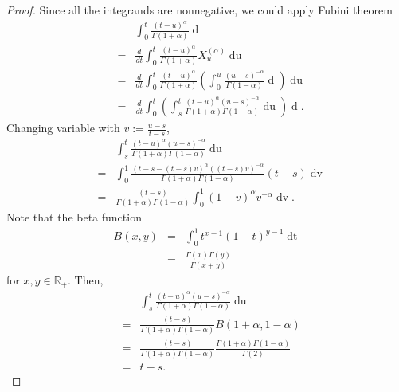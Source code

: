 \documentclass[a4paper, twoside, 11pt]{article}
\theoremstyle{definition}
\newcommand{\brkt}[1]{\left({#1} \right)}
\begin{document}
	\begin{proof}
	  Since all the integrands are nonnegative, we could apply Fubini theorem
	\begin{eqnarray*}
	  &&\int_0^t \frac{(t-u)^\alpha}{\Gamma(1+\alpha)}\mathop{dX^{(\alpha)}_u}\\
	  &=& \frac{d}{dt}\int_0^t \frac{(t-u)^\alpha}{\Gamma(1+\alpha)} X^{(\alpha)}_u\mathop{du}\\
	  &=& \frac{d}{dt}\int_0^t \frac{(t-u)^\alpha}{\Gamma(1+\alpha)} \brkt{ \int_0^u \frac{(u-s)^{-\alpha}}{\Gamma(1-\alpha)}\mathop{dX_s}}\mathop{du}\\
	  &=& \frac{d}{dt}\int_{0}^{t} \brkt{\int_s^t \frac{(t-u)^\alpha (u-s)^{-\alpha}}{\Gamma(1+\alpha)\Gamma(1-\alpha)}\mathop{du}} \mathop{dX_s}.
	\end{eqnarray*}
	Changing variable with $v:= \frac{u-s}{t-s}$,
	\begin{eqnarray*}
	 &&\int_s^t \frac{(t-u)^\alpha (u-s)^{-\alpha}}{\Gamma(1+\alpha)\Gamma(1-\alpha)}\mathop{du}\\
	 &=& \int_0^1 \frac{(t-s - (t-s)v)^\alpha ((t-s)v)^{-\alpha}}{\Gamma(1+\alpha)\Gamma(1-\alpha)}(t-s)\mathop{dv}\\
	 &=& \frac{(t-s)}{\Gamma(1+\alpha)\Gamma(1-\alpha)}\int_0^1 (1-v)^\alpha v^{-\alpha} \mathop{dv}.
	\end{eqnarray*}
  Note that the beta function 
  \begin{eqnarray*}
	B(x,y) &=& \int_0^1 t^{x-1} (1-t)^{y-1} \mathop{dt}\\
	&=& \frac{\Gamma(x)\Gamma(y)}{\Gamma(x+y)}
  \end{eqnarray*}
  for $x, y \in \mathbb{R}_+$.
  Then,
  \begin{eqnarray*}
	 &&\int_s^t \frac{(t-u)^\alpha (u-s)^{-\alpha}}{\Gamma(1+\alpha)\Gamma(1-\alpha)}\mathop{du}\\
	 &=& \frac{(t-s)}{\Gamma(1+\alpha)\Gamma(1-\alpha)} B(1+\alpha, 1-\alpha)\\
	 &=& \frac{(t-s)}{\Gamma(1+\alpha)\Gamma(1-\alpha)} \frac{\Gamma(1+\alpha)\Gamma(1-\alpha)}{\Gamma(2)}\\
	 &=& t-s.
	\end{eqnarray*}

\end{proof}
\end{document}
